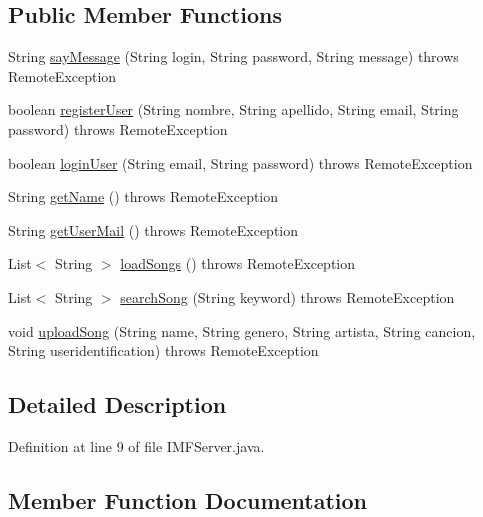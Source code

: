 \subsection*{Public Member Functions}
\begin{DoxyCompactItemize}
\item 
String \hyperlink{interfacees_1_1deusto_1_1spq_1_1server_1_1_i_m_f_server_a368aca60ea2ccba7951fc7e3594b7368}{say\+Message} (String login, String password, String message)  throws Remote\+Exception
\item 
boolean \hyperlink{interfacees_1_1deusto_1_1spq_1_1server_1_1_i_m_f_server_a51f1f5ea155f4f33ce02d39f7ab9696b}{register\+User} (String nombre, String apellido, String email, String password)  throws Remote\+Exception
\item 
boolean \hyperlink{interfacees_1_1deusto_1_1spq_1_1server_1_1_i_m_f_server_afb6983f4de78858b8e73e8f55596374d}{login\+User} (String email, String password)  throws Remote\+Exception
\item 
String \hyperlink{interfacees_1_1deusto_1_1spq_1_1server_1_1_i_m_f_server_aa5653bb7aa1be80a2d94ebd5785ea409}{get\+Name} ()  throws Remote\+Exception
\item 
String \hyperlink{interfacees_1_1deusto_1_1spq_1_1server_1_1_i_m_f_server_a009e437ac332036c21d01ceccc217526}{get\+User\+Mail} ()  throws Remote\+Exception
\item 
List$<$ String $>$ \hyperlink{interfacees_1_1deusto_1_1spq_1_1server_1_1_i_m_f_server_a3a6e5481a3cc2f543c3ef1e90e4e7da6}{load\+Songs} ()  throws Remote\+Exception
\item 
List$<$ String $>$ \hyperlink{interfacees_1_1deusto_1_1spq_1_1server_1_1_i_m_f_server_a4b469cde52367aeb852ff5959ab47bf5}{search\+Song} (String keyword)  throws Remote\+Exception
\item 
void \hyperlink{interfacees_1_1deusto_1_1spq_1_1server_1_1_i_m_f_server_ad1c6aec7730ce9a49c61afdc79a9e740}{upload\+Song} (String name, String genero, String artista, String cancion, String useridentification)  throws Remote\+Exception
\end{DoxyCompactItemize}


\subsection{Detailed Description}


Definition at line 9 of file I\+M\+F\+Server.\+java.



\subsection{Member Function Documentation}
